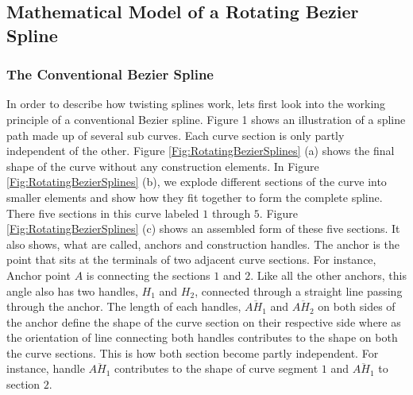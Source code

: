     \subsection{Mathematical Model of a Rotating Bezier Spline}
    \subsubsection{The Conventional Bezier Spline}
        In order to describe how twisting splines work, lets first look into the working principle of a conventional Bezier spline. Figure 1 shows an illustration of a spline path made up of several sub curves. Each curve section is only partly independent of the other. Figure \ref{Fig:RotatingBezierSplines}  (a) shows the final shape of the curve without any construction elements. In Figure \ref{Fig:RotatingBezierSplines} (b), we explode different sections of the curve into smaller elements and show how they fit together to form the complete spline. There five sections in this curve labeled $1$ through $5$. Figure \ref{Fig:RotatingBezierSplines} (c) shows an assembled form of these five sections. It also shows, what are called, anchors and construction handles. The anchor is the point that sits at the terminals of two adjacent curve sections. For instance, Anchor point $A$  is connecting the sections $1$ and $2$. Like all the other anchors, this angle also has two handles, $H_1$ and $H_2$, connected through a straight line passing through the anchor. The length of each handles, $\overline{AH_1}$  and $\overline{AH_2}$ on both sides of the anchor define the shape of the curve section on their respective side where as the orientation of line connecting both handles contributes to the shape on both the curve sections. This is how both section become partly independent. For instance, handle $\overline{AH_1}$ contributes to the shape of curve segment $1$ and $\overline{AH_1}$ to section $2$.


